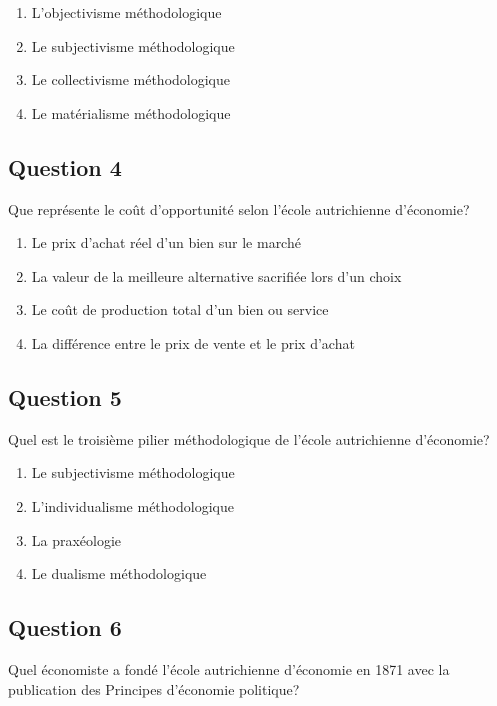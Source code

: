 \documentclass[12pt,a4paper]{article}
\begin{document}
\begin{enumerate}[label=\Alph*., leftmargin=*]
\item L'objectivisme méthodologique
\item Le subjectivisme méthodologique
\item Le collectivisme méthodologique
\item Le matérialisme méthodologique
\end{enumerate}

\bigskip


\subsection*{Question 4}
Que représente le coût d'opportunité selon l'école autrichienne d'économie?

\begin{enumerate}[label=\Alph*., leftmargin=*]
\item Le prix d'achat réel d'un bien sur le marché
\item La valeur de la meilleure alternative sacrifiée lors d'un choix
\item Le coût de production total d'un bien ou service
\item La différence entre le prix de vente et le prix d'achat
\end{enumerate}

\bigskip


\subsection*{Question 5}
Quel est le troisième pilier méthodologique de l'école autrichienne d'économie?

\begin{enumerate}[label=\Alph*., leftmargin=*]
\item Le subjectivisme méthodologique
\item L'individualisme méthodologique
\item La praxéologie
\item Le dualisme méthodologique
\end{enumerate}

\bigskip


\subsection*{Question 6}
Quel économiste a fondé l'école autrichienne d'économie en 1871 avec la publication des Principes d'économie politique?
\end{document}

